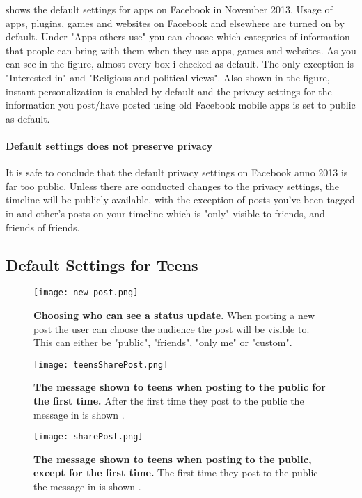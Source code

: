  shows the default settings for apps on Facebook in November 2013. Usage of apps, plugins, games and websites on Facebook and elsewhere are turned on by default. Under "Apps others use" you can choose which categories of information that people can bring with them when they use apps, games and websites. As you can see in the figure, almost every box i checked as default. The only exception is "Interested in" and "Religious and political views". Also shown in the figure, instant personalization is enabled by default and the privacy settings for the information you post/have posted using old Facebook mobile apps is set to public as default. 

\paragraph{Default settings does not preserve privacy} It is safe to conclude that the default privacy settings on Facebook anno 2013 is far too public. Unless there are conducted changes to the privacy settings, the timeline will be publicly available, with the exception of posts you've been tagged in and other's posts on your timeline which is "only" visible to friends, and friends of friends. 

\subsection{Default Settings for Teens}

\begin{figure}[h!]
\centering
\texttt{[image: new\_post.png]}
\caption[Choosing who can see a status update.]{\textbf{Choosing who can see a status update}. When posting a new post the user can choose the audience the post will be visible to. This can either be "public", "friends", "only me" or "custom".} 
\label{fig:newPost}
\end{figure}

\begin{figure}[h!]
\centering
\texttt{[image: teensSharePost.png]}
\caption[The message shown to teens when posting to the public for the first time]{\textbf{The message shown to teens when posting to the public for the first time.} After the first time they post to the public the message in  is shown \cite{defaultTeens}.} 
\label{fig:teensSharePost}
\end{figure}

\begin{figure}[h!]
\centering
\texttt{[image: sharePost.png]}
\caption [The message shown to teens when posting to the public, except for the first time]{\textbf{The message shown to teens when posting to the public, except for the first time.} The first time they post to the public the message in  is shown \cite{defaultTeens}.} 
\label{fig:sharePost}
\end{figure}

